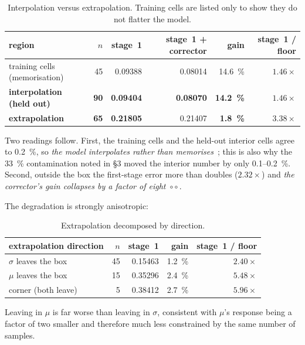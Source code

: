 ﻿\documentclass[11pt,a4paper]{article}
\newcommand{\strong}{\textcolor{green!35!black}{\textbullet\!\textbullet\!\textbullet}}
\newcommand{\weak}{\textcolor{red!65!black}{\textbullet$\circ\circ$}}
\begin{document}
\begin{table}[h]
\centering\small
\begin{tabular}{@{}lrrrrr@{}}
\toprule
region & $n$ & stage~1 & stage~1 + corrector & gain & stage~1 / floor \\
\midrule
training cells (memorisation) & 45 & 0.09388 & 0.08014 & \SI{14.6}{\percent} & $1.46\times$ \\
\textbf{interpolation (held out)} & \textbf{90} & \textbf{0.09404} & \textbf{0.08070} &
  \textbf{\SI{14.2}{\percent}} & $\mathbf{1.46\times}$ \\
\textbf{extrapolation} & \textbf{65} & \textbf{0.21805} & 0.21407 & \textbf{\SI{1.8}{\percent}}
  & $\mathbf{3.38\times}$ \\
\bottomrule
\end{tabular}
\caption{Interpolation versus extrapolation. Training cells are listed only to show they do not
flatter the model.}
\label{tab:regions}
\end{table}

Two readings follow. First, the training cells and the held-out interior cells agree to
\SI{0.2}{\percent}, so \emph{the model interpolates rather than memorises}~\strong; this is also
why the \SI{33}{\percent} contamination noted in \S3 moved the interior number by only
\SI{0.1}{}--\SI{0.2}{\percent}. Second, outside the box the first-stage error more than doubles
($2.32\times$) and \emph{the corrector's gain collapses by a factor of eight}~\weak.

The degradation is strongly anisotropic:

\begin{table}[h]
\centering\small
\begin{tabular}{@{}lrrrr@{}}
\toprule
extrapolation direction & $n$ & stage~1 & gain & stage~1 / floor \\
\midrule
$\sigma$ leaves the box & 45 & 0.15463 & \SI{1.2}{\percent} & $2.40\times$ \\
$\mu$ leaves the box & 15 & 0.35296 & \SI{2.4}{\percent} & $\mathbf{5.48\times}$ \\
corner (both leave) & 5 & 0.38412 & \SI{2.7}{\percent} & $\mathbf{5.96\times}$ \\
\bottomrule
\end{tabular}
\caption{Extrapolation decomposed by direction.}
\end{table}

Leaving in $\mu$ is far worse than leaving in $\sigma$, consistent with $\mu$'s response being a
factor of two smaller and therefore much less constrained by the same number of samples.
\end{document}
